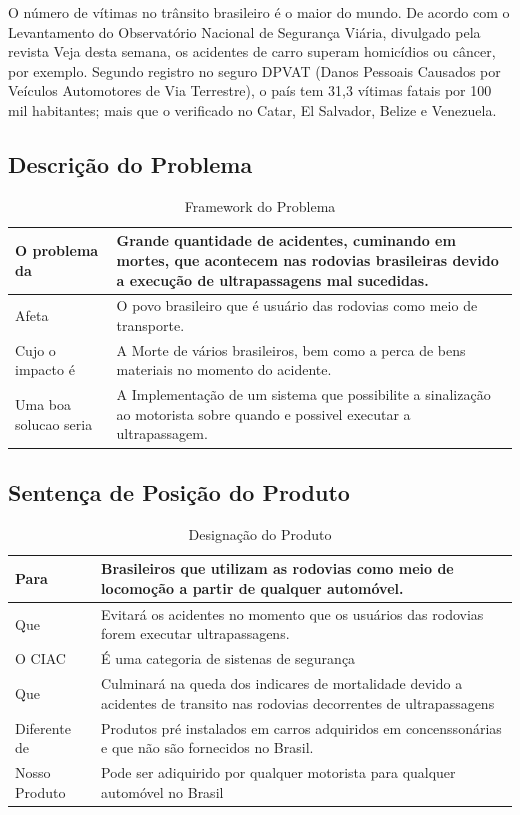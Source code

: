 O número de vítimas no trânsito brasileiro é o maior do mundo. De acordo com o Levantamento do Observatório
 Nacional de Segurança Viária, divulgado pela revista Veja desta semana, os acidentes de carro superam
 homicídios ou câncer, por exemplo. Segundo registro no seguro DPVAT (Danos Pessoais Causados por Veículos
  Automotores de Via Terrestre), o país tem 31,3 vítimas fatais por 100 mil habitantes; mais que o
  verificado no Catar, El Salvador, Belize e Venezuela.\cite{brasilTemMaisVitimasDeTransito}


\subsection{Descrição do Problema}
\begin{table}[ht]
\caption{Framework do Problema}
\centering
\begin{tabular}{| l |  p{7cm} |}
\hline
O problema da & Grande quantidade de acidentes, cuminando em mortes, que acontecem nas rodovias brasileiras devido a execução de ultrapassagens mal sucedidas.  \\
\hline
Afeta & O povo brasileiro que é usuário das rodovias como meio de transporte. \\
\hline
Cujo o impacto é & A Morte de vários brasileiros, bem como a perca de bens materiais no momento do acidente.\\
\hline
Uma boa solucao seria & A Implementação de um sistema que possibilite a sinalização ao motorista sobre quando e possivel executar a ultrapassagem. \\
\hline
\end{tabular}
\end{table}


\subsection{Sentença de Posição do Produto}

\begin{table}[ht]
\caption{Designação do Produto}
\centering
\begin{tabular}{| l |  p{7cm} |}
\hline
Para & Brasileiros que utilizam as rodovias como meio de locomoção a partir de qualquer automóvel. \\
\hline
Que & Evitará os acidentes no momento que os usuários das rodovias forem executar ultrapassagens. \\
\hline
O CIAC & É uma categoria de sistenas de segurança\\
\hline
Que & Culminará na queda dos indicares de mortalidade devido a acidentes de transito nas rodovias decorrentes de ultrapassagens \\
\hline
Diferente de & Produtos pré instalados em carros adquiridos em concenssonárias e que não são fornecidos no Brasil.  \\
\hline
Nosso Produto & Pode ser adiquirido por qualquer motorista para qualquer automóvel no Brasil\\
\hline
\end{tabular}
\end{table}

